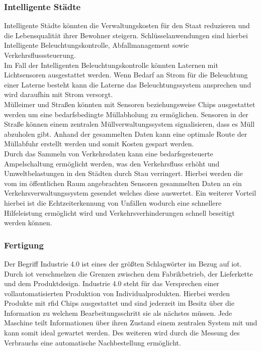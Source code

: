 \documentclass[a4paper, 12pt, twoside, headsepline=true]{scrartcl} %
\begin{document}
\subsubsection{Intelligente Städte}
Intelligente Städte könnten die Verwaltungskosten für den Staat reduzieren und die Lebensqualität ihrer Bewohner steigern. Schlüsselanwendungen sind hierbei Intelligente Beleuchtungskontrolle, Abfallmanagement sowie Verkehrsflusssteuerung\cite[S.51-57]{iotDevelopments}. \\Im Fall der Intelligenten Beleuchtungskontrolle könnten Laternen mit Lichtsensoren ausgestattet werden. Wenn Bedarf an Strom für die Beleuchtung einer Laterne besteht kann die Laterne das Beleuchtungssystem ansprechen und wird daraufhin mit Strom versorgt.\\
Mülleimer und Straßen könnten mit Sensoren beziehungsweise Chips ausgestattet werden um eine bedarfsbedingte Müllabholung zu ermöglichen. Sensoren in der Straße können einem zentralen Müllverwaltungssystem signalisieren, dass es Müll abzuholen gibt. Anhand der gesammelten Daten kann eine optimale Route der Müllabfuhr erstellt werden und somit Kosten gespart werden.\\
Durch das Sammeln von Verkehrsdaten kann eine bedarfsgesteuerte Ampelschaltung ermöglicht werden, was den Verkehrsfluss erhöht und Umweltbelastungen in den Städten durch Stau verringert. Hierbei werden die vom im öffentlichen Raum angebrachten Sensoren gesammelten Daten an ein Verkehrsverwaltungssystem gesendet welches diese auswertet. Ein weiterer Vorteil hierbei ist die Echtzeiterkennung von Unfällen wodurch eine schnellere Hilfeleistung ermöglicht wird und Verkehrsverhinderungen schnell beseitigt werden können.

\subsubsection{Fertigung}
Der Begriff Industrie 4.0 ist eines der größten Schlagwörter im Bezug auf \ac{iot}. Durch \ac{iot} verschmelzen die Grenzen zwischen dem Fabrikbetrieb, der Lieferkette und dem Produktdesign. Industrie 4.0 steht für das Versprechen einer vollautomatisierten Produktion von Individualprodukten. Hierbei werden Produkte mit \ac{rfid} Chips ausgestattet und sind jederzeit im Besitz über die Information zu welchem Bearbeitungsschritt sie als nächstes müssen. Jede Maschine teilt Informationen über ihren Zustand einem zentralen System mit und kann somit ideal gewartet werden. Des weiteren wird durch die Messung des Verbrauchs eine automatische Nachbestellung ermöglicht.
\end{document}
